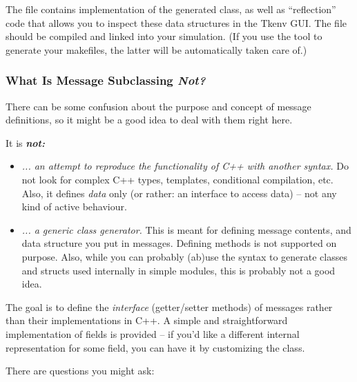 The  file contains implementation of the generated 
class, as well as ``reflection'' code that allows you to inspect these data
structures in the Tkenv GUI. The  file should be compiled and
linked into your simulation. (If you use the  tool
to generate your makefiles, the latter will be automatically taken care of.)


\subsubsection{What Is Message Subclassing \textit{Not?}}

There can be some confusion about the purpose and
concept of message definitions, so it might be a good idea
to deal with them right here.

It is \textit{\textbf{not:}}

\begin{itemize}
  \item{\textit{... an attempt to reproduce the functionality of C++ with another
     syntax.} Do not look for complex C++ types, templates, conditional compilation, etc.
     Also, it defines \textit{data} only (or rather: an interface to access
     data) -- not any kind of active behaviour.}
  \item{\textit{... a generic class generator.} This is meant for defining message
     contents, and data structure you put in messages.
     Defining methods is not supported on purpose.
     Also, while you can probably (ab)use the syntax to
     generate classes and structs used internally in simple modules,
     this is probably not a good idea.}
\end{itemize}

The goal is to define the \textit{interface} (getter/setter methods) of messages
rather than their implementations in C++. A simple and straightforward
implementation of fields is provided -- if you'd like a different internal
representation for some field, you can have it by customizing the class.

There are questions you might ask:

